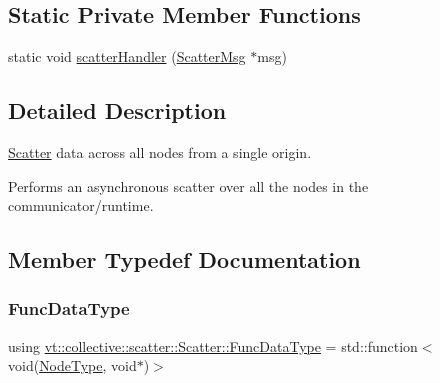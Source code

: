 \subsection*{Static Private Member Functions}
\begin{DoxyCompactItemize}
\item 
static void \hyperlink{structvt_1_1collective_1_1scatter_1_1_scatter_a96466ab88d5f8e69613c69e0e644e10c}{scatter\+Handler} (\hyperlink{structvt_1_1collective_1_1scatter_1_1_scatter_msg}{Scatter\+Msg} $\ast$msg)
\end{DoxyCompactItemize}


\subsection{Detailed Description}
\hyperlink{structvt_1_1collective_1_1scatter_1_1_scatter}{Scatter} data across all nodes from a single origin. 

Performs an asynchronous scatter over all the nodes in the communicator/runtime. 

\subsection{Member Typedef Documentation}
\mbox{\label{structvt_1_1collective_1_1scatter_1_1_scatter_a4040244e8ed36afd5d408c27efceea1b}} 
\subsubsection{\texorpdfstring{Func\+Data\+Type}{FuncDataType}}
{\footnotesize\ttfamily using \hyperlink{structvt_1_1collective_1_1scatter_1_1_scatter_a4040244e8ed36afd5d408c27efceea1b}{vt\+::collective\+::scatter\+::\+Scatter\+::\+Func\+Data\+Type} =  std\+::function$<$void(\hyperlink{namespacevt_a866da9d0efc19c0a1ce79e9e492f47e2}{Node\+Type}, void$\ast$)$>$}

\mbox{\label{structvt_1_1collective_1_1scatter_1_1_scatter_a977d895e42999a4078c6705ac851f447}} 
